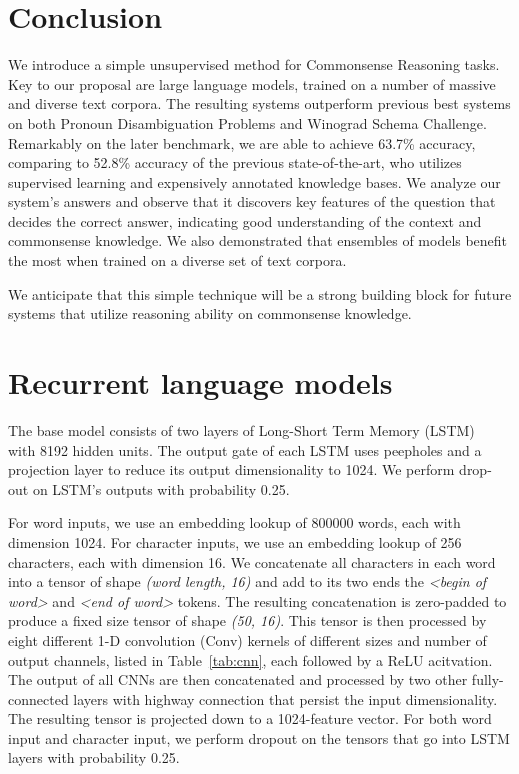 \documentclass{article}
\begin{document}
\section{Conclusion}

We introduce a simple unsupervised method for Commonsense Reasoning tasks. Key to our proposal are large language models, trained on a number of massive and diverse text corpora. The resulting systems outperform previous best systems on both Pronoun Disambiguation Problems and Winograd Schema Challenge. Remarkably on the later benchmark, we are able to achieve 63.7\% accuracy, comparing to 52.8\% accuracy of the previous state-of-the-art, who utilizes supervised learning and expensively annotated knowledge bases. We analyze our system's answers and observe that it discovers key features of the question that decides the correct answer, indicating good understanding of the context and commonsense knowledge. We also demonstrated that ensembles of models benefit the most when trained on a diverse set of text corpora. 

We anticipate that this simple technique will be a strong building block for future systems that utilize reasoning ability on commonsense knowledge.

\small



\clearpage
\appendix

\section{Recurrent language models} \label{sec:lms}

The base model consists of two layers of Long-Short Term Memory (LSTM)~\cite{hochreiter1997long} with 8192 hidden units. The output gate of each LSTM uses peepholes and a projection layer to reduce its output dimensionality to 1024. We perform drop-out on LSTM's outputs with probability 0.25.

For word inputs, we use an embedding lookup of 800000 words, each with dimension 1024. For character inputs, we use an embedding lookup of 256 characters, each with dimension 16. We concatenate all characters in each word into a tensor of shape \emph{(word length, 16)} and add to its two ends the \emph{<begin of word>} and \emph{<end of word>} tokens. The resulting concatenation is zero-padded to produce a fixed size tensor of shape \emph{(50, 16)}. This tensor is then processed by eight different 1-D convolution (Conv) kernels of different sizes and number of output channels, listed in Table~\ref{tab:cnn}, each followed by a ReLU acitvation. 
The output of all CNNs are then concatenated and processed by two other fully-connected layers with highway connection that persist the input dimensionality. The resulting tensor is projected down to a 1024-feature vector. For both word input and character input, we perform dropout on the tensors that go into LSTM layers with probability 0.25.
\end{document}
